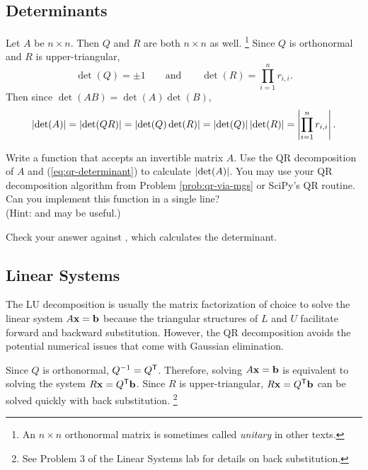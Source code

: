 \subsection*{Determinants} %

Let $A$ be $n \times n$.
Then $Q$ and $R$ are both $n \times n$ as well.%
\footnote{An $n \times n$ orthonormal matrix is sometimes called \emph{unitary} in other texts.}
Since $Q$ is orthonormal and $R$ is upper-triangular,
\[\det(Q) = \pm 1 \qquad\text{and}\qquad \det(R) = \prod_{i=1}^n r_{i,i}.\]
Then since $\det(AB) = \det(A)\det(B)$,
\begin{equation}
\label{eq:qr-determinant}
\left\lvert\det(A)\right\rvert = \left\lvert\det(QR)\right\rvert = \left\lvert\det(Q)\det(R)\right\rvert = \left\lvert\det(Q)\right\rvert\left\lvert\det(R)\right\rvert = \left\lvert\prod_{i=1}^n r_{i,i}\right\rvert.
\end{equation}

\begin{problem} %
Write a function that accepts an invertible matrix $A$.
Use the QR decomposition of $A$ and (\ref{eq:qr-determinant}) to calculate $\left\lvert\det(A)\right\rvert$.
You may use your QR decomposition algorithm from Problem \ref{prob:qr-via-mgs} or SciPy's QR routine.
Can you implement this function in a single line?
\\(Hint:  and  may be useful.)

Check your answer against , which calculates the determinant.
\end{problem}

\subsection*{Linear Systems} %

The LU decomposition is usually the matrix factorization of choice to solve the linear system $A\mathbf{x} = \mathbf{b}$ because the triangular structures of $L$ and $U$ facilitate forward and backward substitution.
However, the QR decomposition avoids the potential numerical issues that come with Gaussian elimination.

Since $Q$ is orthonormal, $Q^{-1}= Q^{\mathsf T}$.
Therefore, solving $A\mathbf{x} = \mathbf{b}$ is equivalent to solving the system $R\mathbf{x} = Q^{\mathsf T}\mathbf{b}$.
Since $R$ is upper-triangular, $R\mathbf{x} = Q^{\mathsf T}\mathbf{b}$ can be solved quickly with back substitution.%
\footnote{See Problem 3 of the Linear Systems lab for details on back substitution.}

